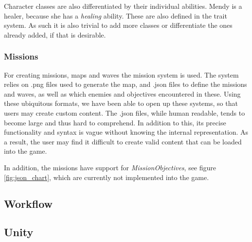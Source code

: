 Character classes are also differentiated by their individual abilities.
Mendy is a healer, because she has a \emph{healing} ability.
These are also defined in the trait system.
As such it is also trivial to add more classes or differentiate the ones already added, if that is desirable.

\subsubsection{Missions}\label{dicsussion:missions}
For creating missions, maps and waves the mission system is used.
The system relies on .png files used to generate the map, and .json files to define the missions and waves, as well as which enemies and objectives encountered in these.
Using these ubiquitous formats, we have been able to open up these systems, so that users may create custom content.
The .json files, while human readable, tends to become large and thus hard to comprehend.
In addition to this, its precise functionality and syntax is vague without knowing the internal representation.
As a result, the user may find it difficult to create valid content that can be loaded into the game.

In addition, the missions have support for \textit{MissionObjectives}, see figure \ref{fig:json_chart}, which are currently not implemented into the game.

\subsection{Workflow}

\subsection{Unity}


%

